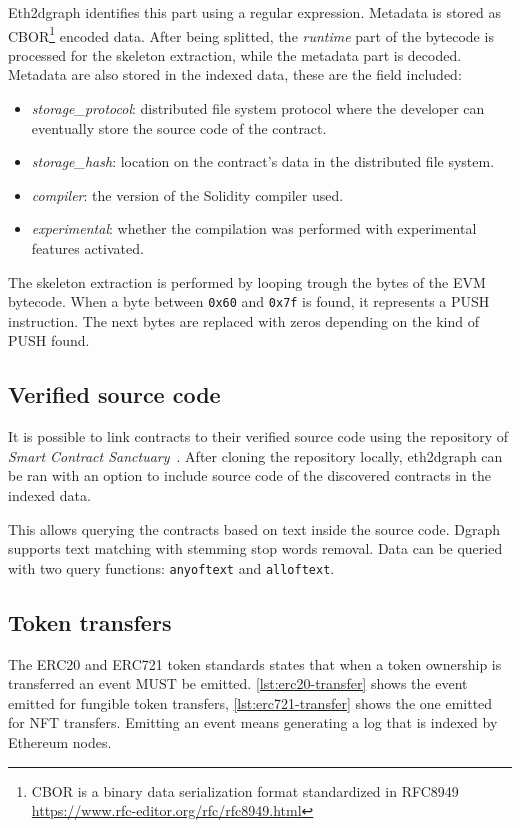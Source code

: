Eth2dgraph identifies this part using a regular expression. Metadata is stored as CBOR\footnote{CBOR is a binary data serialization format standardized in RFC8949 \url{https://www.rfc-editor.org/rfc/rfc8949.html}} encoded data. After being splitted, the \textit{runtime} part of the bytecode is processed for the skeleton extraction, while the metadata part is decoded. Metadata are also stored in the indexed data, these are the field included:

\begin{itemize}
    \item \textit{storage\_protocol}: distributed file system protocol where the developer can eventually store the source code of the contract.
    \item \textit{storage\_hash}: location on the contract's data in the distributed file system.
    \item \textit{compiler}: the version of the Solidity compiler used.
    \item \textit{experimental}: whether the compilation was performed with experimental features activated.
\end{itemize}

The skeleton extraction is performed by looping trough the bytes of the EVM bytecode. When a byte between \texttt{0x60} and \texttt{0x7f} is found, it represents a PUSH instruction. The next bytes are replaced with zeros depending on the kind of PUSH found. 

\subsection{Verified source code}

It is possible to link contracts to their verified source code using the repository of \textit{Smart Contract Sanctuary}~\cite{smart_contract_sanctuary}. After cloning the repository locally, eth2dgraph can be ran with an option to include source code of the discovered contracts in the indexed data.

This allows querying the contracts based on text inside the source code. Dgraph supports text matching with stemming stop words removal. Data can be queried with two query functions: \texttt{anyoftext} and \texttt{alloftext}.

\subsection{Token transfers}

The ERC20 and ERC721 token standards states that when a token ownership is transferred an event MUST be emitted. \cref{lst:erc20-transfer} shows the event emitted for fungible token transfers, \cref{lst:erc721-transfer} shows the one emitted for NFT transfers. Emitting an event means generating a log that is indexed by Ethereum nodes.

